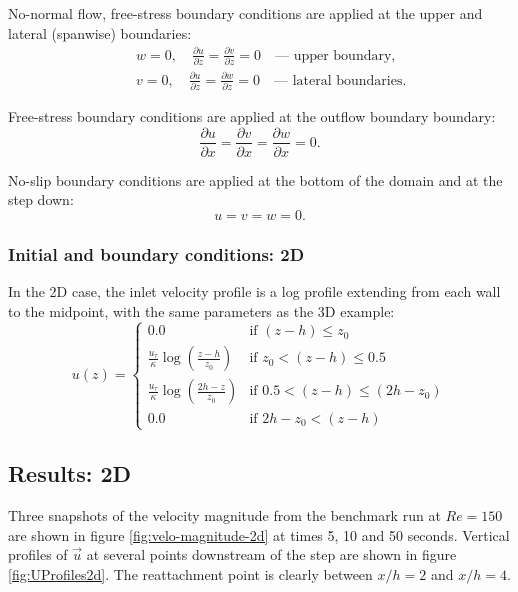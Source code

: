 No-normal flow, free-stress boundary conditions are applied at the upper and lateral
(spanwise) boundaries:
\begin{eqnarray*}
&&w=0,\quad \frac{\partial u}{\partial z} = \frac{\partial v}{\partial z} = 0 \quad\textrm{--- upper boundary},\\
&&v=0,\quad \frac{\partial u}{\partial z} = \frac{\partial w}{\partial z} = 0 \quad\textrm{--- lateral boundaries}.
\end{eqnarray*}

Free-stress boundary conditions are applied at the outflow boundary boundary:
\begin{equation*}
\frac{\partial u}{\partial x} = \frac{\partial v}{\partial x} = \frac{\partial w}{\partial x} = 0.
\end{equation*}

No-slip boundary conditions are applied at the bottom of the domain and at the step down:
\begin{equation*}
u=v=w=0.
\end{equation*}

\subsubsection{Initial and boundary conditions: 2D}
In the 2D case, the inlet velocity profile is a log profile extending from each wall to the midpoint, with the same parameters as the 3D example:
\begin{equation*}
u(z) =
  \begin{cases}
    0.0 & \text{if } (z-h) \leq z_0 \\
    \frac{u_{\tau}}{\kappa} \log \left(\frac{z - h}{z_0}\right) & \text{if } z_0 < (z-h) \leq 0.5 \\
    \frac{u_{\tau}}{\kappa} \log \left(\frac{2h - z}{z_0}\right) & \text{if } 0.5 < (z-h) \leq (2h-z_0) \\
    0.0 & \text{if } 2h-z_0 < (z-h)
  \end{cases}
\end{equation*}


\subsection{Results: 2D}
Three snapshots of the velocity magnitude from the benchmark run at $Re=150$
are shown in figure \ref{fig:velo-magnitude-2d} at times 5, 10 and 50 seconds.
Vertical profiles of $\vec{u}$ at several points downstream of the step are shown
in figure \ref{fig:UProfiles2d}. The reattachment point is clearly between $x/h=2$ and $x/h=4$.

